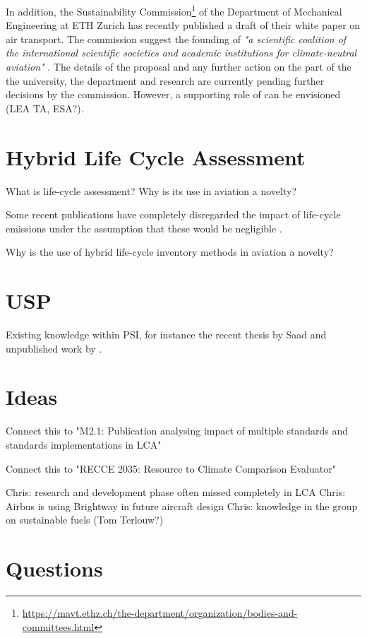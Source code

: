 \documentclass{article}
\begin{document}
    In addition, the Sustainability Commission\footnote{\url{https://mavt.ethz.ch/the-department/organization/bodies-and-committees.html}} of the Department of Mechanical Engineering at ETH Zurich has recently published a draft of their white paper on air transport. The commission suggest the founding of  \textit{"a scientific coalition of the international scientific societies and academic institutions for climate-neutral aviation"} \cite{mazzotti_air_2022}. The details of the proposal and any further action on the part of the the university, the department and research are currently pending further decisions by the commission. However, a supporting role of can be envisioned (LEA TA, ESA?).

\section{Hybrid Life Cycle Assessment}

	What is life-cycle assessment?
	Why is its use in aviation a novelty?
	
	Some recent publications have completely disregarded the impact of life-cycle emissions under the assumption that these would be negligible \cite{brazzola_definitions_2022}.
	
	Why is the use of hybrid life-cycle inventory methods in aviation a novelty?
	
\section{USP}
	
    Existing knowledge within PSI, for instance the recent thesis by Saad \cite{saad_synthetic_2022} and unpublished work by \cite{sacchi_climate-neutral_2022}.

\section{Ideas}

    Connect this to "M2.1: Publication analysing impact of multiple standards and standards implementations in LCA"

    Connect this to "RECCE 2035: Resource to Climate Comparison Evaluator"

	Chris: research and development phase often missed completely in LCA
	Chris: Airbus is using Brightway in future aircraft design
	Chris: knowledge in the group on sustainable fuels (Tom Terlouw?)
	

\section{Questions}
\end{document}
